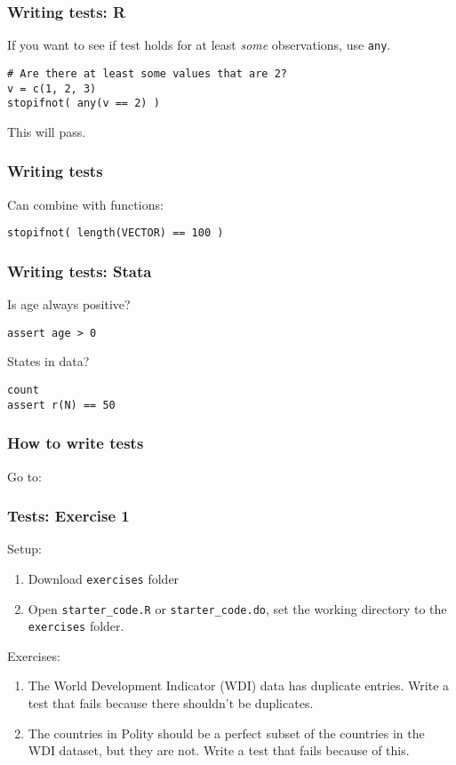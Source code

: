 \documentclass[11pt]{beamer}
\begin{document}
\begin{frame}[fragile]\frametitle{Writing tests: R}
If you want to see if test holds for at least \emph{some} observations, use \texttt{any}.
\vspace{1cm}

\begin{verbatim}
# Are there at least some values that are 2?
v = c(1, 2, 3)
stopifnot( any(v == 2) )
\end{verbatim}
This will pass.
\end{frame}

\begin{frame}[fragile]\frametitle{Writing tests}

Can combine with functions:
\vspace{1cm}
\begin{verbatim}
stopifnot( length(VECTOR) == 100 )
\end{verbatim}
\end{frame}


\begin{frame}[fragile]\frametitle{Writing tests: Stata}
Is age always positive?

\vspace{0.5cm}
\begin{verbatim}
assert age > 0
\end{verbatim}
 States in data?
\begin{verbatim}
count
assert r(N) == 50
\end{verbatim}
\end{frame}


\begin{frame}\frametitle{How to write tests}
    Go to:
\end{frame}




\begin{frame}\frametitle{Tests: Exercise 1}
Setup:
\begin{enumerate}
    \pause \item Download \texttt{exercises} folder
    \pause \item Open \texttt{starter\_code.R} or \texttt{starter\_code.do}, set the working directory to the \texttt{exercises} folder.
\end{enumerate}

Exercises:
\begin{enumerate}
    \pause \item The World Development Indicator (WDI) data has duplicate entries. \alert{Write a test that fails because there shouldn't be duplicates.}
    \pause \item The countries in Polity should be a perfect subset of the countries in the WDI dataset, but they are not. \alert{Write a test that fails because of this.}
\end{enumerate}
\end{frame}
\end{document}

